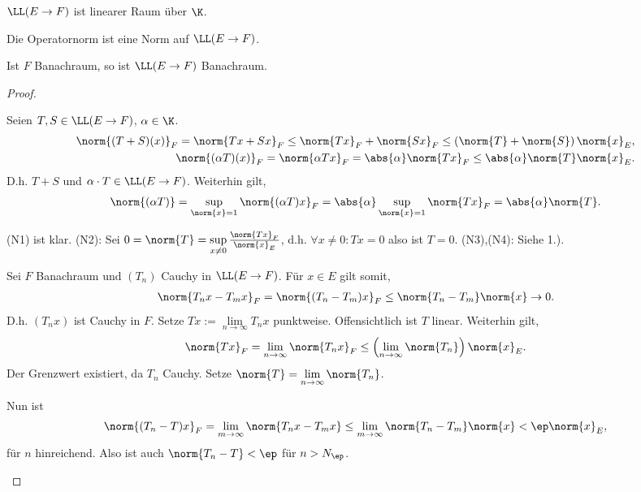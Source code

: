 \begin{prop}
\label{prop:2.9}
\begin{propenum}
  \item $\LL(E\to F)$ ist linearer Raum über $\K$.
  \item Die Operatornorm ist eine Norm auf $\LL(E\to F)$.
  \item Ist $F$ Banachraum, so ist $\LL(E\to F)$ Banachraum.\fishhere
\end{propenum}
\end{prop}
\begin{proof}
\begin{proofenum}
  \item Seien $T,S\in\LL(E\to F)$, $\alpha\in \K$.
\begin{align*}
\norm{(T+S)(x)}_F =\norm{Tx+Sx}_F \le \norm{Tx}_F + \norm{Sx}_F \le
\left(\norm{T}+\norm{S}\right)\norm{x}_E,\\
\norm{(\alpha T)(x)}_F = \norm{\alpha Tx}_F = \abs{\alpha}\norm{Tx}_F \le
\abs{\alpha}\norm{T}\norm{x}_E.
\end{align*}
D.h. $T+S$ und $\alpha\cdot T\in \LL(E\to F)$. Weiterhin gilt,
\begin{align*}
\norm{(\alpha T)} = \sup\limits_{\norm{x}=1} \norm{(\alpha T)x}_F = 
\abs{\alpha}\sup\limits_{\norm{x}=1}\norm{Tx}_F =\abs{\alpha}\norm{T}. 
\end{align*} 
  \item (N1) ist klar. (N2): Sei $0=\norm{T} = \sup\limits_{x\neq 0}
  \frac{\norm{Tx}_F}{\norm{x}_E}$, d.h. $\forall x\neq 0: Tx = 0$ also ist
  $T=0$. (N3),(N4): Siehe 1.).
  \item Sei $F$ Banachraum und $(T_n)$ Cauchy in $\LL(E\to F)$. Für $x\in E$
  gilt somit,
\begin{align*}
\norm{T_nx - T_mx}_F = \norm{(T_n-T_m)x}_F \le \norm{T_n-T_m}\norm{x}\to 0.
\end{align*}
D.h. $(T_nx)$ ist Cauchy in $F$. Setze $Tx := \lim\limits_{n\to\infty} T_nx$
punktweise. Offensichtlich ist $T$ linear. Weiterhin gilt,
\begin{align*}
\norm{Tx}_F = \lim\limits_{n\to\infty} \norm{T_nx}_F \le
\left(\lim\limits_{n\to\infty}\norm{T_n}\right)\norm{x}_E.
\end{align*}
Der Grenzwert existiert, da $T_n$ Cauchy. Setze
$\norm{T}=\lim\limits_{n\to\infty}\norm{T_n}$.

Nun ist
\begin{align*}
\norm{(T_n-T)x}_F = \lim\limits_{m\to\infty}\norm{T_nx-T_mx} \le
\lim\limits_{m\to\infty}\norm{T_n-T_m}\norm{x} <\ep\norm{x}_E,
\end{align*}
für $n$ hinreichend. Also ist auch $\norm{T_n-T} <\ep$ für $n> N_\ep$.\qedhere
\end{proofenum}
\end{proof}

